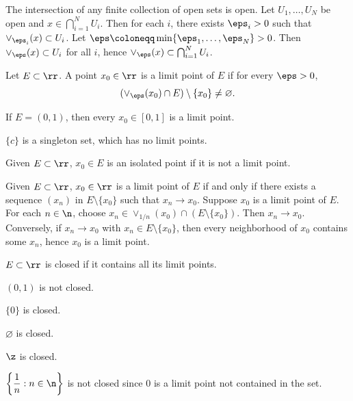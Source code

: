 \begin{theorem}{
    The intersection of any finite collection of open sets is open.
}
                 Let $U_1,\ldots, U_N$ be open and $x\in\bigcap_{i=1}^N U_i$.
                 Then for each $i$, there exists $\eps_i > 0$ such that $\vee_{\eps_i}(x)\subset U_i$.
                 Let $\eps\coloneqq\min\{\eps_1,\ldots,\eps_N\} > 0$.
                 Then $\vee_{\eps}(x)\subset U_i$ for all $i$, hence $\vee_{\eps}(x)\subset\bigcap_{i=1}^N U_i$.
\end{theorem}

\begin{definition}
    Let $E\subset\rr$.
    A point $x_0\in\rr$ is a limit point of $E$ if for every $\eps > 0$,
    \[
        (\vee_{\eps}(x_0)\cap E)\setminus\{x_0\} \neq \varnothing.
    \]
\end{definition}

\begin{example}
    If $E = (0,1)$, then every $x_0\in[0,1]$ is a limit point.
\end{example}

\begin{example}
    $\{c\}$ is a singleton set, which has no limit points.
\end{example}

\begin{definition}
    Given $E\subset\rr$, $x_0\in E$ is an isolated point if it is not a limit point.
\end{definition}

\begin{proposition}{
    Given $E\subset\rr$, $x_0\in\rr$ is a limit point of $E$ if and only if there exists a sequence $(x_n)$ in $E\setminus\{x_0\}$ such that $x_n\to x_0$.
}
              Suppose $x_0$ is a limit point of $E$.
              For each $n\in\n$, choose $x_n\in \vee_{1/n}(x_0)\cap (E\setminus\{x_0\})$.
              Then $x_n\to x_0$.
              Conversely, if $x_n\to x_0$ with $x_n\in E\setminus\{x_0\}$, then every neighborhood of $x_0$ contains some $x_n$, hence $x_0$ is a limit point.
\end{proposition}

\begin{definition}[Closed]
    $E\subset\rr$ is closed if it contains all its limit points.
\end{definition}

\begin{example}
    $(0,1)$ is not closed.

    $\{0\}$ is closed.

    $\varnothing$ is closed.

    $\z$ is closed.

    $\left\{\dfrac{1}{n} : n\in\n\right\}$ is not closed since $0$ is a limit point not contained in the set.
\end{example}

